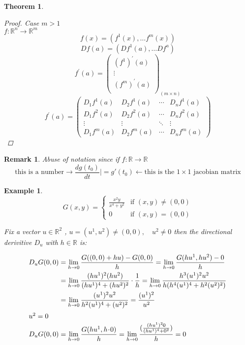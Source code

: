 \documentclass[11pt]{article}
\def\RR{\mathbb{R}}
\newtheorem{theorem}{Theorem}[section]
\newtheorem{example}{Example}[section]
\newtheorem*{remark}{Remark}
\begin{document}
\begin{theorem}
\begin{proof}
Case $m>1 $\\
$f:\RR^n \rightarrow \RR^m $
\[f(x) = (f^{1} (x), \dots f^{m}(x))\]
\[Df(a) = (Df^{1} (a), \dots Df^{a})\]
\[ f^{'}(a) = \begin{pmatrix}
  (f^1)^{'}(a) \\
  \vdots\\
(f^m)^{'}(a)\\
 \end{pmatrix}_{(m \times n)}\]
\[ f^{'}(a) = \begin{pmatrix}
  D_{1}f^{1}(a) & D_{2}f^{1}(a) & \cdots &D_{n}f^{1}(a) \\
  D_{1}f^{2}(a) & D_{2}f^{2}(a) & \cdots & D_{n}f^{2}(a) \\
  \vdots  & \vdots  & \ddots & \vdots  \\
  D_{1}f^{m}(a) & D_{2}f^{m}(a) & \cdots & D_{n}f^{m}(a)
 \end{pmatrix}\]
\end{proof}
\end{theorem}

\begin{remark}
Abuse of notation since if $f:\RR \rightarrow \RR$
\[\text{this is a number} \rightarrow  \frac{dg(t_{0})}{dt}| = g'(t_{0}) \leftarrow \text{this is the $1 \times 1$ jacobian matrix}\]
\end{remark}

\begin{example}
\[ G(x,y) =
  \begin{cases}
   \frac{x^{2}y}{x^{4} + y^{2}} & \text{if } (x,y) \neq (0,0) \\
   0       & \text{if } (x,y) = (0,0)
  \end{cases}\]

Fix a vector $u \in \RR^2$ , $u=(u^1 , u^2 ) \neq (0,0), \quad u^2 \neq 0$ then the directional derivitive $D_{u}$ with $h \in \RR$ is:

\begin{align*}
D_{u}G(0,0) &= \lim_{h \rightarrow 0}\frac{G((0,0) + hu) - G(0,0)}{h} =  \lim_{h \rightarrow 0}\frac{G(hu^1 , hu^2 ) - 0}{h}\\
&= \lim_{h \rightarrow 0}\frac{(hu^1)^2(hu^2)}{(hu^1)^4 + (hu^2)^2} \cdot \frac{1}{h} =   \lim_{h \rightarrow 0}\frac{h^3 (u^1)^2 u^2}{h(h^4(u^1)^4 + h^2(u^2)^2)}\\
&=  \lim_{h \rightarrow 0}\frac{ (u^1)^2 u^2}{h^2(u^1)^4 + (u^2)^2} = \frac{(u^1)^2}{u^2}\\
\shortintertext{$u^2=0$}
D_{u}G(0,0) &=  \lim_{h \rightarrow 0}\frac{G(hu^1 , h \! \cdot \!0)}{h}=  \lim_{h \rightarrow 0}\frac{(\frac{(hu^1)^2 \! \cdot \! 0}{(hu^1)^4 + 0^2})}{h} = 0
\end{align*}




\end{example}
\end{document}

